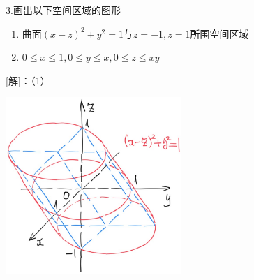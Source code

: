 % 
% 
% 
% 
% 
% 

3.画出以下空间区域的图形
  \begin{enumerate}[(1)]
    \setlength{\itemindent}{1cm}
    \item 曲面$(x-z)^2+y^2=1$与$z=-1,z=1$所围空间区域
    \item $0\leq x\leq 1,0\leq y\leq x,0\leq z\leq xy$
  \end{enumerate}

[解]：（1）
\begin{center}
	\includegraphics[width=0.5\textwidth]{./images/ch8/xzy-cl.jpg}
\end{center}

